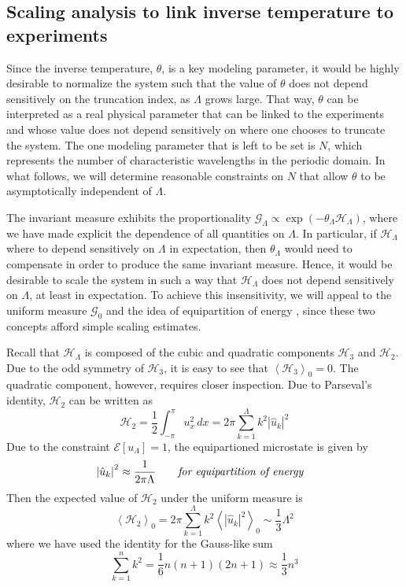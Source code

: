 \documentclass[11pt]{article}
\newcommand{\abs}[1]{\left| #1 \right|}
\newcommand{\mean}[1]{\left< #1 \right>}
\newcommand{\dx}{\, dx}
\newcommand{\lamfac}{N}
\newcommand{\En}{\mathcal{E}}
\newcommand{\uhat}{\hat{u}}
\newcommand{\Ham}{\mathcal{H}}
\newcommand{\Hthree}{\Ham_{3}}
\newcommand{\Htwo}{\Ham_{2}}
\newcommand{\uL}{u_{\Lambda}}
\newcommand{\Gibbs}{\mathcal{G}}
\newcommand{\Gz}{\Gibbs_0}
\newcommand{\meanz}[1]{\mean{#1}_0}
\begin{document}
\subsection{Scaling analysis to link inverse temperature to experiments}

	Since the inverse temperature, $\theta$, is a key modeling parameter, it would be highly desirable to normalize the system such that the value of $\theta$ does not depend sensitively on the truncation index, as $\Lambda$ grows large. That way, $\theta$ can be interpreted as a real physical parameter that can be linked to the experiments and whose value does not depend sensitively on where one chooses to truncate the system. The one modeling parameter that is left to be set is $\lamfac$, which represents the number of characteristic wavelengths in the periodic domain. In what follows, we will determine reasonable constraints on $\lamfac$ that allow $\theta$ to be asymptotically independent of $\Lambda$.
	
	The invariant measure exhibits the proportionality $ \Gibbs_{\Lambda} \propto \exp(-\theta_{\Lambda} \Ham_{\Lambda})$, where we have made explicit the dependence of all quantities on $\Lambda$. In particular, if $\Ham_{\Lambda}$ where to depend sensitively on $\Lambda$ in expectation, then $\theta_{\Lambda}$ would need to compensate in order to produce the same invariant measure. Hence, it would be desirable to scale the system in such a way that $\Ham_{\Lambda}$ does not depend sensitively on $\Lambda$, at least in expectation. 
To achieve this insensitivity, we will appeal to the uniform measure $\Gz$ and the idea of equipartition of energy \cite{abramov2003}, since these two concepts afford simple scaling estimates.

Recall that $\Ham_{\Lambda}$ is composed of the cubic and quadratic components $\Hthree$ and $\Htwo$. Due to the odd symmetry of $\Hthree$, it is easy to see that $\meanz{\Hthree} = 0$. The quadratic component, however, requires closer inspection. Due to Parseval's identity, $\Htwo$ can be written as
\begin{equation}
\Htwo = \frac{1}{2} \int_{-\pi}^{\pi} u_x^2 \dx = 2 \pi \sum_{k=1}^{\Lambda} k^2 \abs{\uhat_k}^2
\end{equation}
Due to the constraint $\En[\uL] = 1$, the equipartioned microstate is given by 
\begin{align}
&\abs{\uhat_k}^2 \approx \frac{1}{2 \pi \Lambda}	 \qquad \mbox{\em for equipartition of energy}
\end{align}
Then the expected value of $\Htwo$ under the uniform measure is
\begin{equation}
\label{HtwoExpect}
\mean{\Htwo}_0 = 2 \pi \sum_{k=1}^{\Lambda} {k}^ 2 \mean{\abs{\uhat_k}^2}_0 \sim \frac{1}{3} \Lambda^2
\end{equation}
where we have used the identity for the Gauss-like sum
\begin{equation}
\sum_{k=1}^{n} {k}^ 2 = \frac{1}{6} n(n+1)(2n+1) \approx \frac{1}{3} n^3
\end{equation}
\end{document}
